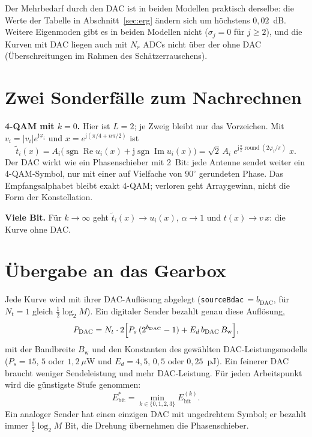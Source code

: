 \documentclass[11pt,a4paper]{article}
\newcommand{\re}{\operatorname{Re}}
\newcommand{\im}{\operatorname{Im}}
\newcommand{\file}[1]{\texttt{#1}}
\begin{document}
Der Mehrbedarf durch den DAC ist in beiden Modellen praktisch derselbe: die Werte der Tabelle in
Abschnitt~\ref{sec:erg} ändern sich um höchstens $0{,}02$~dB. Weitere Eigenmoden gibt es in beiden
Modellen nicht ($\sigma_j=0$ für $j\ge2$), und die Kurven mit DAC liegen auch mit $N_r$ ADCs nicht
über der ohne DAC (Überschreitungen im Rahmen des Schätzerrauschens).

\section{Zwei Sonderfälle zum Nachrechnen}

\textbf{4-QAM mit $k=0$.} Hier ist $L=2$; je Zweig bleibt nur das Vorzeichen. Mit
$v_i=|v_i|e^{\mathrm j\varphi_i}$ und $x=e^{\mathrm j(\pi/4+n\pi/2)}$ ist
\begin{equation}
\tilde t_i(x)=A_i\bigl(\operatorname{sgn}\re u_i(x)+\mathrm j\operatorname{sgn}\im u_i(x)\bigr)
=\sqrt2\,A_i\;e^{\mathrm j\frac\pi2\operatorname{round}(2\varphi_i/\pi)}\;x .
\end{equation}
Der DAC wirkt wie ein Phasenschieber mit 2~Bit: jede Antenne sendet weiter ein 4-QAM-Symbol, nur
mit einer auf Vielfache von $90^\circ$ gerundeten Phase. Das Empfangsalphabet bleibt exakt 4-QAM;
verloren geht Arraygewinn, nicht die Form der Konstellation.

\textbf{Viele Bit.} Für $k\to\infty$ geht $\tilde t_i(x)\to u_i(x)$, $\alpha\to1$ und $t(x)\to v\,x$:
die Kurve ohne DAC.

\section{Übergabe an das Gearbox}\label{sec:gb}

Jede Kurve wird mit ihrer DAC-Auflösung abgelegt (\file{sourceBdac}$\,=b_{\mathrm{DAC}}$, für
$N_t=1$ gleich $\tfrac12\log_2M$). Ein digitaler Sender bezahlt genau diese Auflösung,
\begin{equation}
P_{\mathrm{DAC}}=N_t\cdot2\Bigl[P_s\,(2^{b_{\mathrm{DAC}}}-1)+E_d\,b_{\mathrm{DAC}}\,B_{\mathrm w}\Bigr],
\end{equation}
mit der Bandbreite $B_{\mathrm w}$ und den Konstanten des gewählten DAC-Leistungsmodells
($P_s=15$, $5$ oder $1{,}2~\mu$W und $E_d=4{,}5$, $0{,}5$ oder $0{,}25$~pJ). Ein feinerer DAC
braucht weniger Sendeleistung und mehr DAC-Leistung. Für jeden Arbeitspunkt wird die günstigste
Stufe genommen:
\begin{equation}
E_{\mathrm{bit}}^\ast=\min_{k\in\{0,1,2,3\}}E_{\mathrm{bit}}^{(k)} .
\end{equation}
Ein analoger Sender hat einen einzigen DAC mit ungedrehtem Symbol; er bezahlt immer
$\tfrac12\log_2M$ Bit, die Drehung übernehmen die Phasenschieber.
\end{document}
